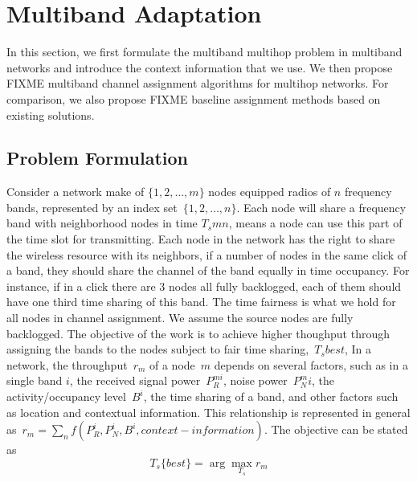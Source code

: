 \section{Multiband Adaptation}
\label{sec:model}

In this section, we first formulate the multiband 
multihop problem 
in multiband networks and introduce the context information 
that we use. We then propose {FIXME} multiband channel assignment algorithms for multihop networks. For comparison, we also propose {FIXME} baseline assignment methods based on existing solutions.

\subsection{Problem Formulation}
Consider a network make of $\{1,2,\ldots,m\}$ nodes equipped radios of $n$ frequency bands, represented by an index set~$\{1,2, \ldots, n\}$. 
Each node will share a frequency band with neighborhood nodes in time $T_s{mn}$, means a node can use this part of the time slot for transmitting. Each node in the network has the right to share the wireless resource with its neighbors, if a number of nodes in the same click of a band, they should share the channel of the band equally in time occupancy. For instance, if in a click there are 3 nodes all fully backlogged, each of them should have one third time sharing of this band. The time fairness is what we hold for all nodes in channel assignment. 
We assume the source nodes are fully backlogged. 
The objective of the work is to achieve higher thoughput through assigning the bands to the nodes subject to fair time sharing,~$T_s{best}$,
In a network, the throughput~$r_m$ of a node~$m$ depends on several factors, such as in a single band $i$, the received signal power~$P_R^{mi}$, noise power~$P_N^mi$, the activity/occupancy level~$B^i$, the time sharing of a band, and other factors such as location and contextual information. 
This relationship is represented in general as~$r_m =\sum_n{f(P_R^i,P_N^i,B^i,context-information)}$. The objective can be stated as
\begin{equation}
T_s\{best\}= \arg \max_{T_s} r_m 
\end{equation}

